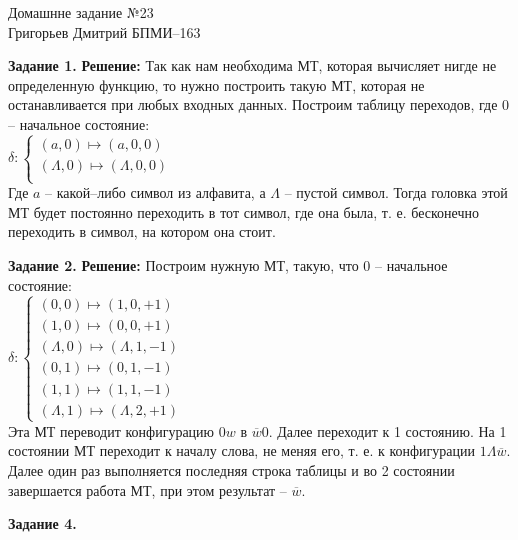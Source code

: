 \documentclass[12pt,a4paper]{scrartcl}
\begin{document}
	\begin{center}	
		Домашнне задание №23 \\
		Григорьев Дмитрий БПМИ--163
	\end{center}
	\textbf{Задание 1.}
	\newline
	\textbf{Решение:}
	\newline
	\indent
	Так как нам необходима МТ, которая вычисляет нигде не определенную функцию, то нужно построить такую МТ, которая не останавливается при любых входных данных. Построим таблицу переходов, где 0 -- начальное состояние:\\
	$\delta :
	\begin{cases}
	(a, 0) \longmapsto (a, 0, 0)\\
	(\varLambda, 0) \longmapsto (\varLambda, 0, 0)\\	
	\end{cases}
	$ \\
	Где $a$ -- какой--либо символ из алфавита, а $\varLambda$ -- пустой символ. Тогда головка этой МТ будет постоянно переходить в тот символ, где она была, т. е. бесконечно переходить в символ, на котором она стоит.
	\begin{flushright}	
		\textbf{}
	\end{flushright}
	\textbf{Задание 2.} 
	\newline
	\textbf{Решение:} 
	\newline
	\indent
	Построим нужную МТ, такую, что 0 -- начальное состояние: \\
	$\delta :
	\begin{cases}
	(0, 0) \longmapsto (1, 0, +1)\\
	(1, 0) \longmapsto (0, 0, +1)\\
	(\varLambda, 0) \longmapsto (\varLambda, 1, -1)\\
	(0, 1) \longmapsto (0, 1, -1)\\
	(1, 1) \longmapsto (1, 1, -1)\\
	(\varLambda, 1) \longmapsto (\varLambda, 2, +1)
	\end{cases}
	$ \\
	Эта МТ переводит конфигурацию 0$w$ в $\overline{w}$0. Далее переходит к 1 состоянию. На 1 состоянии МТ переходит к началу слова, не меняя его, т. е. к конфигурации $1\varLambda\overline{w}$. Далее один раз выполняется последняя строка таблицы и во 2 состоянии завершается работа МТ, при этом результат -- $\overline{w}$.
	\begin{flushright}
		\textbf{}
	\end{flushright}
	\textbf{Задание 4.}
\end{document}

